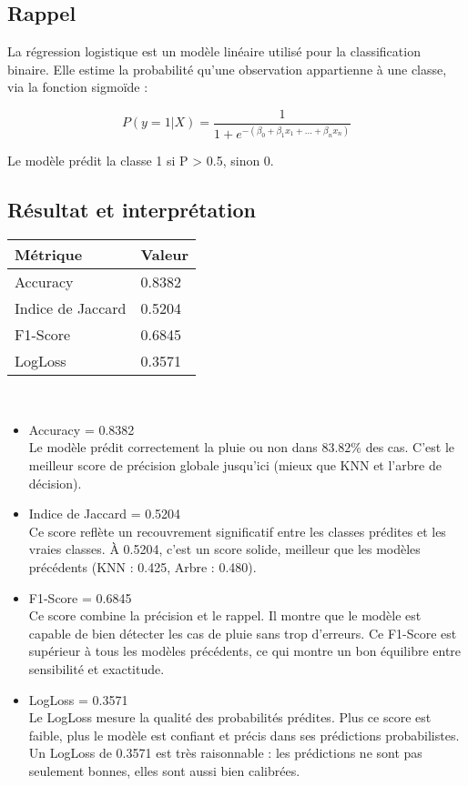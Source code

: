 \documentclass[a4paper,11pt]{article}
\begin{document}
	\subsection{Rappel}
	\indent
	La régression logistique est un modèle linéaire utilisé pour la classification binaire.
	Elle estime la probabilité qu'une observation appartienne à une classe, via la fonction sigmoïde :
	
	$$
	P(y=1|X) = \frac{1}{1 + e^{-(\beta_0 + \beta_1 x_1 + ... + \beta_n x_n)}}
	$$
	
	 Le modèle prédit la classe 1 si P > 0.5, sinon 0.\\
	
	
	\subsection{Résultat et interprétation}
	\begin{center}
		\begin{tabular}{|l|l|}
			\hline
			\textbf{Métrique} & \textbf{Valeur}  \\
			\hline
			Accuracy & 0.8382 \\
			\hline
			Indice de Jaccard & 0.5204 \\
			\hline
			F1-Score & 0.6845 \\
			\hline
			LogLoss & 0.3571\\
			\hline
		\end{tabular}
	\end{center}
	\\
	
	\begin{itemize}
		\item Accuracy = 0.8382 \\
		Le modèle prédit correctement la pluie ou non dans $83.82 \%$ des cas.
		C’est le meilleur score de précision globale jusqu’ici (mieux que KNN et l’arbre de décision).
		
		
		\item   Indice de Jaccard = 0.5204\\
		Ce score reflète un recouvrement significatif entre les classes prédites et les vraies classes.
		À 0.5204, c’est un score solide, meilleur que les modèles précédents (KNN : 0.425, Arbre : 0.480).
		
		
		\item  F1-Score = 0.6845 \\
		Ce score combine la précision et le rappel. Il montre que le modèle est capable de bien détecter les cas de pluie sans trop d’erreurs.
		Ce F1-Score est supérieur à tous les modèles précédents, ce qui montre un bon équilibre entre sensibilité et exactitude.
		
		\newpage
		\item   LogLoss = 0.3571 \\
		Le LogLoss mesure la qualité des probabilités prédites. Plus ce score est faible, plus le modèle est confiant et précis dans ses prédictions probabilistes.\\Un LogLoss de 0.3571 est très raisonnable : les prédictions ne sont pas seulement bonnes, elles sont aussi bien calibrées.
	\end{itemize}
	
\end{document}

